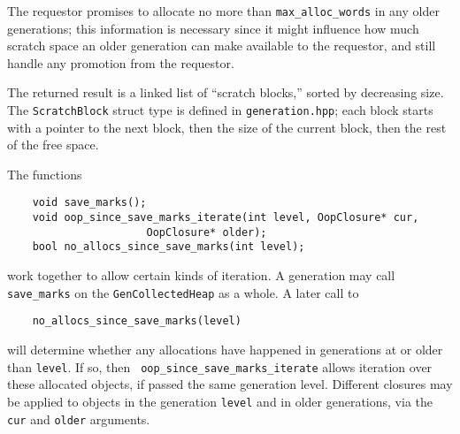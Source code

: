 \documentclass{article}
\begin{document}
The requestor promises to allocate no more than {\tt max\_alloc\_words}
in any older generations; this information is necessary since it might
influence how much scratch space an older generation can make
available to the requestor, and still handle any promotion from the
requestor.

The returned result is a linked list of ``scratch blocks,'' sorted by
decreasing size.  The {\tt ScratchBlock} struct type is defined in
{\tt generation.hpp}; each block starts with a pointer to the next
block, then the size of the current block, then the rest of the free
space.

The functions
\begin{verbatim}
    void save_marks();
    void oop_since_save_marks_iterate(int level, OopClosure* cur,
				      OopClosure* older);
    bool no_allocs_since_save_marks(int level);
\end{verbatim}
work together to allow certain kinds of iteration.  A generation may
call {\tt save\_marks} on the {\tt GenCollectedHeap} as a whole.
A later call to
\begin{verbatim}
    no_allocs_since_save_marks(level)
\end{verbatim}
will determine whether any allocations have happened in generations at
or older than {\tt level}.  If so, then {\tt
oop\_since\_save\_marks\_iterate} allows iteration over these
allocated objects, if passed the same generation level.  Different
closures may be applied to objects in the generation {\tt level} and
in older generations, via the {\tt cur} and {\tt older} arguments.
\end{document}
